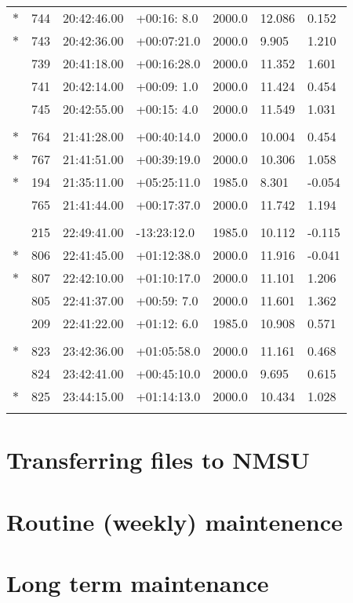 \documentclass[10pt]{report}
\renewcommand{\[}{\begin{eqnarray}}
\renewcommand{\]}{\end{eqnarray}}
\begin{document}
\begin{tabular}{lllllll}
$\ast$&744&20:42:46.00&+00:16: 8.0&2000.0 & 12.086 &  0.152 \\
$\ast$&743&20:42:36.00&+00:07:21.0&2000.0 &  9.905 &  1.210 \\
 &739&20:41:18.00&+00:16:28.0&2000.0 & 11.352 &  1.601 \\
 &741&20:42:14.00&+00:09: 1.0&2000.0 & 11.424 &  0.454 \\
 &745&20:42:55.00&+00:15: 4.0&2000.0 & 11.549 &  1.031 \\
\multicolumn{7}{l}{ }\\
$\ast$&764&21:41:28.00&+00:40:14.0&2000.0 & 10.004 &  0.454 \\
$\ast$&767&21:41:51.00&+00:39:19.0&2000.0 & 10.306 &  1.058 \\
$\ast$&194&21:35:11.00&+05:25:11.0&1985.0 &  8.301 & -0.054 \\
 &765&21:41:44.00&+00:17:37.0&2000.0 & 11.742 &  1.194 \\
\multicolumn{7}{l}{ }\\
 &215&22:49:41.00&-13:23:12.0&1985.0 & 10.112 & -0.115 \\
$\ast$&806&22:41:45.00&+01:12:38.0&2000.0 & 11.916 & -0.041 \\
$\ast$&807&22:42:10.00&+01:10:17.0&2000.0 & 11.101 &  1.206 \\
 &805&22:41:37.00&+00:59: 7.0&2000.0 & 11.601 &  1.362 \\
 &209&22:41:22.00&+01:12: 6.0&1985.0 & 10.908 &  0.571 \\
\multicolumn{7}{l}{ }\\
$\ast$&823&23:42:36.00&+01:05:58.0&2000.0 & 11.161 &  0.468 \\
 &824&23:42:41.00&+00:45:10.0&2000.0 &  9.695 &  0.615 \\
$\ast$&825&23:44:15.00&+01:14:13.0&2000.0 & 10.434 &  1.028 \\
\multicolumn{7}{l}{ }
\end{tabular}

\chapter{Transferring files to NMSU}

\chapter{Routine (weekly) maintenence}

\chapter{Long term maintenance}


\printindex
\end{document}
